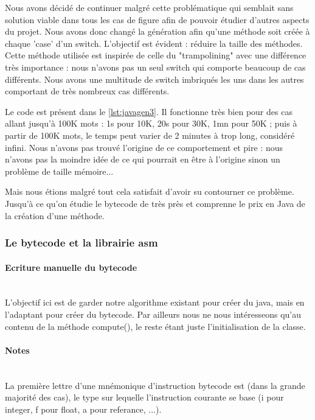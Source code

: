 Nous avons décidé de continuer malgré cette problématique qui semblait sans solution viable
dans tous les cas de figure afin de pouvoir étudier d'autres aspects du projet. Nous avons
donc changé la génération afin qu'une méthode soit créée à chaque 'case' d'un switch.
L'objectif est évident : réduire la taille des méthodes. Cette méthode utilisée est inspirée
de celle du "trampolining" avec une différence très importance : nous n'avons pas un seul
switch qui comporte beaucoup de cas différents. Nous avons une multitude de switch imbriqués
les uns dans les autres comportant de très nombreux cas différents.


Le code est présent dans le \autoref{lst:javagen3}. Il fonctionne très bien pour des cas
allant jusqu'à 100K mots : 1s pour 10K, 20s pour 30K, 1mn pour 50K ;
puis à partir de 100K mots, le temps peut varier de 2 minutes
à trop long, considéré infini. Nous n'avons pas trouvé l'origine de ce
comportement et pire : nous n'avons pas la moindre idée de ce qui pourrait en être à
l'origine sinon un problème de taille mémoire...


Mais nous étions malgré tout cela satisfait d'avoir su contourner ce problème. Jusqu'à ce
qu'on étudie le bytecode de très près et comprenne le prix en Java de la création d'une
méthode.

\subsubsection{Le bytecode et la librairie asm}

\paragraph{Ecriture manuelle du bytecode}
~\\
L'objectif ici est de garder notre algorithme existant pour créer du java,
mais en l'adaptant pour créer du bytecode. Par ailleurs nous ne nous intéresseons
qu'au contenu de la méthode compute(),
le reste étant juste l'initialisation de la classe.

\paragraph{Notes}
~\\
La première lettre d'une mnémonique d'instruction bytecode est (dans la grande majorité des cas), le type sur lequelle l'instruction courante se base (i pour integer, f pour float, a pour referance, ...).

